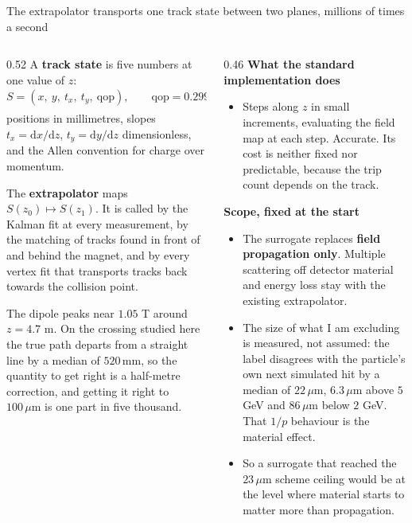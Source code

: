 \documentclass[aspectratio=169,10pt]{beamer}
\newcommand{\um}{\ensuremath{\,\mu\mathrm{m}}}
\newcommand{\mm}{\ensuremath{\,\mathrm{mm}}}
\newcommand{\qop}{\ensuremath{\mathrm{qop}}}
\newcommand{\hl}[1]{{\color{accent}\textbf{#1}}}
\begin{document}
\begin{frame}[shrink=25]{The extrapolator transports one track state between two planes, millions of times a second}
  \vspace{1mm}
  \begin{columns}[T]
    \begin{column}{0.52\textwidth}
      A \hl{track state} is five numbers at one value of $z$:
      \[ S = (x,\ y,\ t_x,\ t_y,\ \qop), \qquad
         \qop = 0.299792458\,\frac{q}{p[\mathrm{GeV}]}, \]
      positions in millimetres, slopes
      $t_x = \mathrm{d}x/\mathrm{d}z$, $t_y = \mathrm{d}y/\mathrm{d}z$
      dimensionless, and the Allen convention for charge over momentum.

      \medskip
      The \hl{extrapolator} maps $S(z_0) \mapsto S(z_1)$. It is called by the
      Kalman fit at every measurement, by the matching of tracks found in front
      of and behind the magnet, and by every vertex fit that transports tracks
      back towards the collision point.

      \medskip
      The dipole peaks near $1.05$ T around $z = 4.7$ m. On the crossing studied
      here the true path departs from a straight line by a median of
      \hl{$520\mm$}, so the quantity to get right is a half-metre correction,
      and getting it right to $100\um$ is one part in five thousand.
    \end{column}
    \begin{column}{0.46\textwidth}
      \textbf{What the standard implementation does}
      \begin{itemize}\small
        \item Steps along $z$ in small increments, evaluating the field map at
              each step. Accurate. Its cost is neither fixed nor predictable,
              because the trip count depends on the track.
      \end{itemize}
      \medskip
      \textbf{Scope, fixed at the start}
      \begin{itemize}\small
        \item The surrogate replaces \hl{field propagation only}. Multiple
              scattering off detector material and energy loss stay with the
              existing extrapolator.
        \item The size of what I am excluding is measured, not assumed: the
              label disagrees with the particle's own next simulated hit by a
              median of $22\um$, $6.3\um$ above $5$ GeV and $86\um$ below
              $2$ GeV. That $1/p$ behaviour is the material effect.
        \item So a surrogate that reached the $23\um$ scheme ceiling would be at
              the level where material starts to matter more than propagation.
      \end{itemize}
    \end{column}
  \end{columns}
\end{frame}
\end{document}
